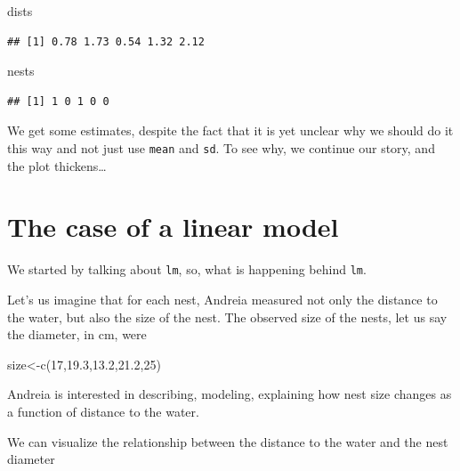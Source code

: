 \documentclass[
]{book}
\newenvironment{Shaded}{\begin{snugshade}}{\end{snugshade}}
\newcommand{\DecValTok}[1]{\textcolor[rgb]{0.00,0.00,0.81}{#1}}
\newcommand{\FloatTok}[1]{\textcolor[rgb]{0.00,0.00,0.81}{#1}}
\newcommand{\FunctionTok}[1]{\textcolor[rgb]{0.00,0.00,0.00}{#1}}
\newcommand{\NormalTok}[1]{#1}
\newcommand{\OtherTok}[1]{\textcolor[rgb]{0.56,0.35,0.01}{#1}}
\begin{document}
\begin{Shaded}
\begin{Highlighting}[]
\NormalTok{dists}
\end{Highlighting}
\end{Shaded}

\begin{verbatim}
## [1] 0.78 1.73 0.54 1.32 2.12
\end{verbatim}

\begin{Shaded}
\begin{Highlighting}[]
\NormalTok{nests}
\end{Highlighting}
\end{Shaded}

\begin{verbatim}
## [1] 1 0 1 0 0
\end{verbatim}

We get some estimates, despite the fact that it is yet unclear why we should do it this way and not just use \texttt{mean} and \texttt{sd}. To see why, we continue our story, and the plot thickens\ldots{}

\hypertarget{the-case-of-a-linear-model}{%
\section{The case of a linear model}\label{the-case-of-a-linear-model}}

We started by talking about \texttt{lm}, so, what is happening behind \texttt{lm}.

Let's us imagine that for each nest, Andreia measured not only the distance to the water, but also the size of the nest. The observed size of the nests, let us say the diameter, in cm, were

\begin{Shaded}
\begin{Highlighting}[]
\NormalTok{size}\OtherTok{\textless{}{-}}\FunctionTok{c}\NormalTok{(}\DecValTok{17}\NormalTok{,}\FloatTok{19.3}\NormalTok{,}\FloatTok{13.2}\NormalTok{,}\FloatTok{21.2}\NormalTok{,}\DecValTok{25}\NormalTok{)}
\end{Highlighting}
\end{Shaded}

Andreia is interested in describing, modeling, explaining how nest size changes as a function of distance to the water.

We can visualize the relationship between the distance to the water and the nest diameter
\end{document}
